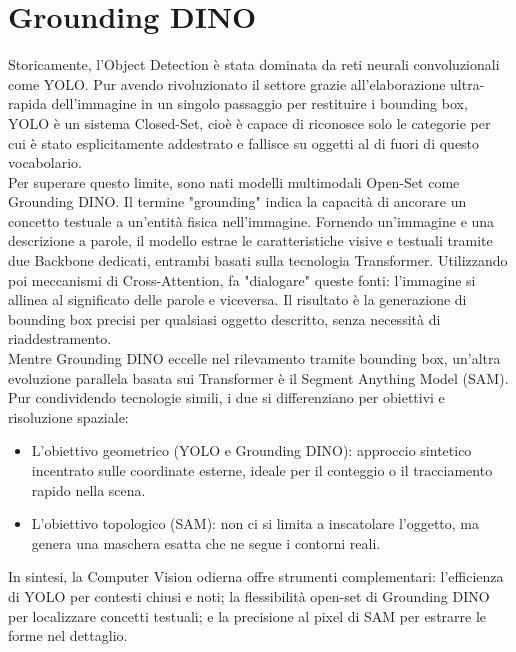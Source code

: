 \chapter{Grounding DINO}

Storicamente, l'Object Detection è stata dominata da reti neurali convoluzionali come YOLO. Pur avendo rivoluzionato il settore grazie all'elaborazione ultra-rapida dell'immagine
in un singolo passaggio per restituire i bounding box, YOLO è un sistema Closed-Set, cioè è capace di riconosce solo le categorie per cui è stato esplicitamente addestrato
e fallisce su oggetti al di fuori di questo vocabolario. \cite{redmon2016yolo} \\

\noindent
Per superare questo limite, sono nati modelli multimodali Open-Set come Grounding DINO. Il termine "grounding" indica la capacità di ancorare un concetto testuale a un'entità fisica nell'immagine.
Fornendo un'immagine e una descrizione a parole, il modello estrae le caratteristiche visive e testuali tramite due Backbone dedicati, entrambi basati sulla tecnologia Transformer.
Utilizzando poi meccanismi di Cross-Attention, fa "dialogare" queste fonti: l'immagine si allinea al significato delle parole e viceversa.
Il risultato è la generazione di bounding box precisi per qualsiasi oggetto descritto, senza necessità di riaddestramento. \cite{liu2023grounding} \\

\noindent
Mentre Grounding DINO eccelle nel rilevamento tramite bounding box, un'altra evoluzione parallela basata sui Transformer è il Segment Anything Model (SAM).
Pur condividendo tecnologie simili, i due si differenziano per obiettivi e risoluzione spaziale:

\begin{itemize}
    \item L'obiettivo geometrico (YOLO e Grounding DINO): approccio sintetico incentrato sulle coordinate esterne, ideale per il conteggio o il tracciamento rapido nella scena.
    
    \item L'obiettivo topologico (SAM): non ci si limita a inscatolare l'oggetto, ma genera una maschera esatta che ne segue i contorni reali.
\end{itemize}

\noindent
In sintesi, la Computer Vision odierna offre strumenti complementari: l'efficienza di YOLO per contesti chiusi e noti; la flessibilità open-set di Grounding DINO per localizzare concetti testuali;
e la precisione al pixel di SAM per estrarre le forme nel dettaglio.